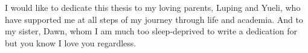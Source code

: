 
\begin{dedication}

I would like to dedicate this thesis to my loving parents, Luping and Yueli,
who have supported me at all steps of my journey through life and academia. And
to my sister, Dawn, whom I am much too sleep-deprived to write a dedication for
but you know I love you regardless.

\end{dedication}

